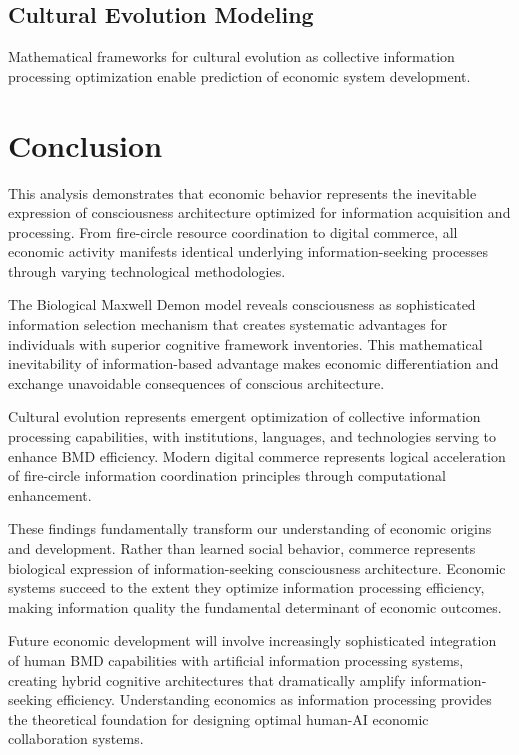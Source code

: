 \documentclass[12pt,a4paper]{article}
\begin{document}
\subsection{Cultural Evolution Modeling}

Mathematical frameworks for cultural evolution as collective information processing optimization enable prediction of economic system development.

\section{Conclusion}

This analysis demonstrates that economic behavior represents the inevitable expression of consciousness architecture optimized for information acquisition and processing. From fire-circle resource coordination to digital commerce, all economic activity manifests identical underlying information-seeking processes through varying technological methodologies.

The Biological Maxwell Demon model reveals consciousness as sophisticated information selection mechanism that creates systematic advantages for individuals with superior cognitive framework inventories. This mathematical inevitability of information-based advantage makes economic differentiation and exchange unavoidable consequences of conscious architecture.

Cultural evolution represents emergent optimization of collective information processing capabilities, with institutions, languages, and technologies serving to enhance BMD efficiency. Modern digital commerce represents logical acceleration of fire-circle information coordination principles through computational enhancement.

These findings fundamentally transform our understanding of economic origins and development. Rather than learned social behavior, commerce represents biological expression of information-seeking consciousness architecture. Economic systems succeed to the extent they optimize information processing efficiency, making information quality the fundamental determinant of economic outcomes.

Future economic development will involve increasingly sophisticated integration of human BMD capabilities with artificial information processing systems, creating hybrid cognitive architectures that dramatically amplify information-seeking efficiency. Understanding economics as information processing provides the theoretical foundation for designing optimal human-AI economic collaboration systems.
\end{document}
